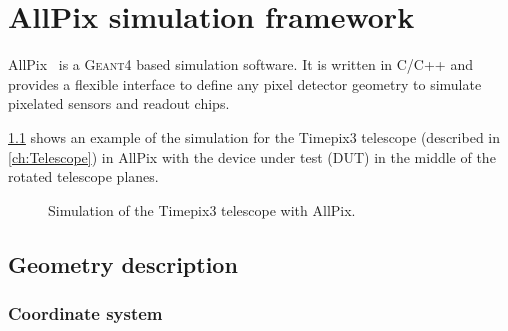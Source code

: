 \chapter{AllPix simulation framework}
\label{ch:AllPix}


AllPix~\cite{allpix} is a \textsc{Geant4} based simulation
software. It is written in C/C++ and provides a flexible interface to
define any pixel detector geometry to simulate pixelated sensors and
readout chips.

\cref{fig:TPX3TelescopeAllpix} shows an example of the simulation for
the Timepix3 telescope (described in \cref{ch:Telescope}) in AllPix
with the device under test (DUT) in the middle of the rotated telescope
planes.

\begin{figure}[htbp]
  \centering
  \caption{Simulation of the Timepix3 telescope with AllPix.}
  \label{fig:TPX3TelescopeAllpix}
\end{figure}

\section{Geometry description}
\subsection{Coordinate system}

